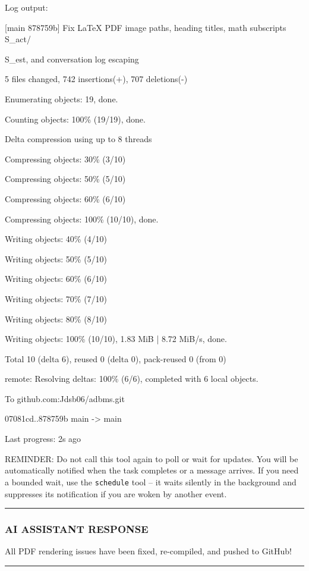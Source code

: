 \documentclass[11pt,a4paper]{article}
\begin{document}
{{{Log output:

[main 878759b] Fix LaTeX PDF image paths, heading titles, math subscripts S\_act/

S\_est, and conversation log escaping

5 files changed, 742 insertions(+), 707 deletions(-)

Enumerating objects: 19, done.

Counting objects: 100\% (19/19), done.

Delta compression using up to 8 threads

Compressing objects:  30\% (3/10)

Compressing objects:  50\% (5/10)

Compressing objects:  60\% (6/10)

Compressing objects: 100\% (10/10), done.

Writing objects:  40\% (4/10)

Writing objects:  50\% (5/10)

Writing objects:  60\% (6/10)

Writing objects:  70\% (7/10)

Writing objects:  80\% (8/10)

Writing objects: 100\% (10/10), 1.83 MiB | 8.72 MiB/s, done.

Total 10 (delta 6), reused 0 (delta 0), pack-reused 0 (from 0)

remote: Resolving deltas: 100\% (6/6), completed with 6 local objects.

To github.com:Jdsb06/adbms.git

07081cd..878759b  main -> main


Last progress: 2s ago



REMINDER: Do not call this tool again to poll or wait for updates. You will be automatically notified when the task completes or a message arrives. If you need a bounded wait, use the \texttt{schedule} tool -- it waits silently in the background and suppresses its notification if you are woken by another event.


\hrule

\subsubsection{AI ASSISTANT RESPONSE}

All PDF rendering issues have been fixed, re-compiled, and pushed to GitHub!


\hrule


}}}
\end{document}
